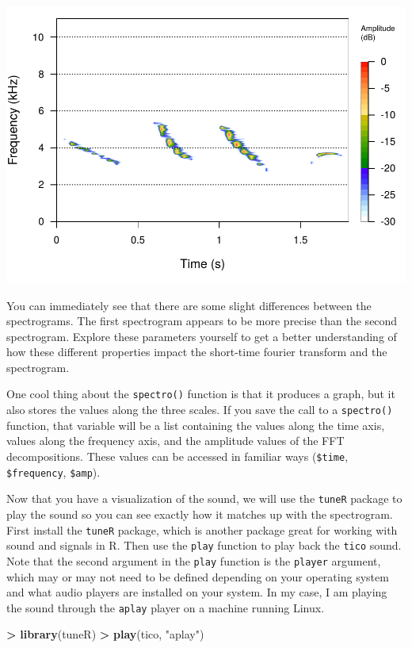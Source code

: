 \documentclass[
]{krantz}
\makeatletter
\newenvironment{Shaded}{\begin{snugshade}}{\end{snugshade}}
\newcommand{\KeywordTok}[1]{\textcolor[rgb]{0.27,0.27,0.27}{\textbf{#1}}}
\newcommand{\NormalTok}[1]{#1}
\newcommand{\OperatorTok}[1]{\textcolor[rgb]{0.43,0.43,0.43}{\textbf{#1}}}
\newcommand{\StringTok}[1]{\textcolor[rgb]{0.5,0.5,0.5}{#1}}
\newenvironment{kframe}{%
\medskip{}
\setlength{\fboxsep}{.8em}
 \def\at@end@of@kframe{}%
 \ifinner\ifhmode%
  \def\at@end@of@kframe{\end{minipage}}%
  \begin{minipage}{\columnwidth}%
 \fi\fi%
 \def\FrameCommand##1{\hskip\@totalleftmargin \hskip-\fboxsep
 \colorbox{shadecolor}{##1}\hskip-\fboxsep
     \hskip-\linewidth \hskip-\@totalleftmargin \hskip\columnwidth}%
 \MakeFramed {\advance\hsize-\width
   \@totalleftmargin\z@ \linewidth\hsize
   \@setminipage}}%
 {\par\unskip\endMakeFramed%
 \at@end@of@kframe}
\renewenvironment{Shaded}{\begin{kframe}}{\end{kframe}}
\makeatother
\begin{document}
\includegraphics[width=1\linewidth]{bookdown_files/figure-latex/unnamed-chunk-331-1}

You can immediately see that there are some slight differences between the spectrograms. The first spectrogram appears to be more precise than the second spectrogram. Explore these parameters yourself to get a better understanding of how these different properties impact the short-time fourier transform and the spectrogram.

One cool thing about the \texttt{spectro()} function is that it produces a graph, but it also stores the values along the three scales. If you save the call to a \texttt{spectro()} function, that variable will be a list containing the values along the time axis, values along the frequency axis, and the amplitude values of the FFT decompositions. These values can be accessed in familiar ways (\texttt{\$time}, \texttt{\$frequency}, \texttt{\$amp}).

Now that you have a visualization of the sound, we will use the \texttt{tuneR} package to play the sound so you can see exactly how it matches up with the spectrogram. First install the \texttt{tuneR} package, which is another package great for working with sound and signals in R. Then use the \texttt{play} function to play back the \texttt{tico} sound. Note that the second argument in the \texttt{play} function is the \texttt{player} argument, which may or may not need to be defined depending on your operating system and what audio players are installed on your system. In my case, I am playing the sound through the \texttt{aplay} player on a machine running Linux.

\begin{Shaded}
\begin{Highlighting}[]
\OperatorTok{\textgreater{}}\StringTok{ }\KeywordTok{library}\NormalTok{(tuneR)}
\OperatorTok{\textgreater{}}\StringTok{ }\KeywordTok{play}\NormalTok{(tico, }\StringTok{"aplay"}\NormalTok{)}
\end{Highlighting}
\end{Shaded}
\end{document}
